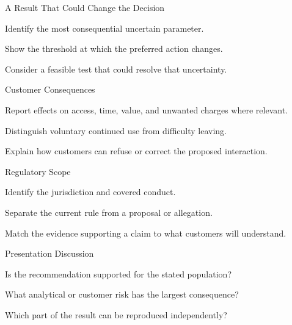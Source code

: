 \begin{frame}{A Result That Could Change the Decision}
\vfill
\begin{slidebullets}
\item Identify the most consequential uncertain parameter.
\item Show the threshold at which the preferred action changes.
\item Consider a feasible test that could resolve that uncertainty.
\end{slidebullets}
\vfill
{}
\end{frame}
\begin{frame}{Customer Consequences}
\vfill
\begin{slidebullets}
\item Report effects on access, time, value, and unwanted charges where relevant.
\item Distinguish voluntary continued use from difficulty leaving.
\item Explain how customers can refuse or correct the proposed interaction.
\end{slidebullets}
\vfill
{}
\end{frame}
\begin{frame}{Regulatory Scope}
\vfill
\begin{slidebullets}
\item Identify the jurisdiction and covered conduct.
\item Separate the current rule from a proposal or allegation.
\item Match the evidence supporting a claim to what customers will understand.
\end{slidebullets}
\vfill
{}
\end{frame}
\begin{frame}{Presentation Discussion}
\vfill
\begin{slidebullets}
\item Is the recommendation supported for the stated population?
\item What analytical or customer risk has the largest consequence?
\item Which part of the result can be reproduced independently?
\end{slidebullets}
\vfill
{}
\end{frame}

